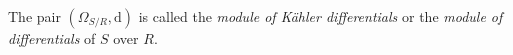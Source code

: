 \begin{definition}
\label{definition-differentials}
The pair $(\Omega_{S/R}, \text{d})$ is called the {\it module
of K\"ahler differentials} or the {\it module of differentials}
of $S$ over $R$.
\end{definition}